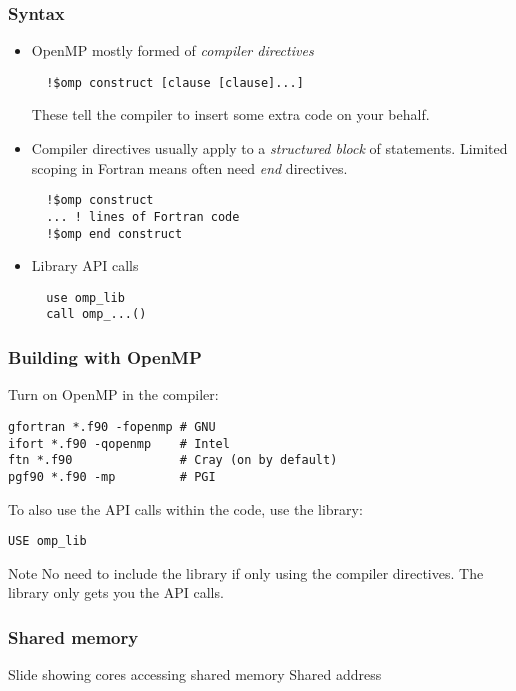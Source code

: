 \documentclass{beamer}
\begin{document}
\begin{frame}[fragile]
\frametitle{Syntax}
\begin{itemize}
\item OpenMP mostly formed of \emph{compiler directives}\\
  \begin{verbatim}
  !$omp construct [clause [clause]...]
  \end{verbatim}
  These tell the compiler to insert some extra code on your behalf.

\item Compiler directives usually apply to a \emph{structured block} of statements.
Limited scoping in Fortran means often need \emph{end} directives.
  \begin{verbatim}
  !$omp construct
  ... ! lines of Fortran code
  !$omp end construct
  \end{verbatim}

\item Library API calls
  \begin{verbatim}
  use omp_lib
  call omp_...()
  \end{verbatim}

\end{itemize}
\end{frame}

\begin{frame}[fragile]
\frametitle{Building with OpenMP}

Turn on OpenMP in the compiler:
\begin{verbatim}
gfortran *.f90 -fopenmp # GNU
ifort *.f90 -qopenmp    # Intel
ftn *.f90               # Cray (on by default)
pgf90 *.f90 -mp         # PGI
\end{verbatim}

To also use the API calls within the code, use the library:
\begin{verbatim}
USE omp_lib
\end{verbatim}

\begin{alertblock}{Note}
No need to include the library if only using the compiler directives.
The library only gets you the API calls.
\end{alertblock}
\end{frame}

\begin{frame}
\frametitle{Shared memory}
Slide showing cores accessing shared memory
Shared address
\end{frame}
\end{document}
